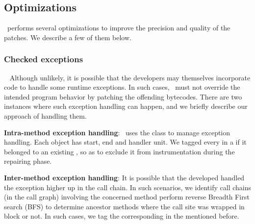 
\subsection{Optimizations}
\label{subsec:optimizations}

\tool\ performs several optimizations to improve the precision and quality of
the patches. We describe a few of them below.

\subsubsection{Checked exceptions }
\label{subsubsec:callChainLookUp}
~\newline
Although unlikely, it is possible that the developers may themselves incorporate
code to handle some runtime exceptions. In such cases, \tool\ must not override
the intended program behavior by patching the offending bytecodes. There are two
instances where such exception handling can happen, and we briefly describe
our approach of handling them.

\begin{mylist}

 \item \textbf{Intra-method exception handling}: \soot\ uses the 
class to manage exception handling. Each  object has start, end and
handler unit.  We tagged every  in a  if it belonged
to an existing , so as to exclude it from instrumentation during the
repairing phase.

 \item \textbf{Inter-method exception handling}: It is possible that the
developed handled the exception higher up in the call chain. In such scenarios,
we identify call chains (in the call graph) involving the concerned method
perform reverse Breadth First search (BFS) to determine ancestor methods where
the call site was wrapped in  block or not. In such cases, we
tag the corresponding  in the  mentioned before.

\end{mylist}

